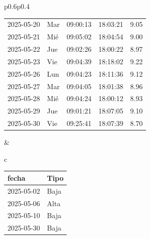 \documentclass[11pt,a4paper]{article}
\newcommand{\infobox}[2]{
  \begin{tcolorbox}[
    colback=grisclaro,
    colframe=corporativo,
    title=#1,
    fonttitle=\bfseries
  ]
#2
  \end{tcolorbox}
}
\begin{document}
\begin{tabular}{p{}p{}}
{\begin{tabular}{p{2cm} p{0.6cm} p{1.2cm} p{1.2cm} r}
2025-05-20 & Mar & 09:00:13 & 18:03:21 &9.05\\
\rowcolor{white}%
2025-05-21 & Mié & 09:05:02 & 18:04:54 &9.00\\
\rowcolor{white}%
2025-05-22 & Jue & 09:02:26 & 18:00:22 &8.97\\
\rowcolor{white}%
2025-05-23 & Vie & 09:04:39 & 18:18:02 &9.22\\
\rowcolor{white}%
2025-05-26 & Lun & 09:04:23 & 18:11:36 &9.12\\
\rowcolor{white}%
2025-05-27 & Mar & 09:04:05 & 18:01:38 &8.96\\
\rowcolor{white}%
2025-05-28 & Mié & 09:04:24 & 18:00:12 &8.93\\
\rowcolor{white}%
2025-05-29 & Jue & 09:01:21 & 18:07:05 &9.10\\
\rowcolor{white}%
2025-05-30 & Vie & 09:25:41 & 18:07:39 &8.70\\

\bottomrule
\end{tabular}
}
&
\begin{tabular}{c}

\infobox{D\'ias At\'ipicos}{
\begin{tabular}{p{2cm} p{2cm}}
\toprule
\rowcolor{grisclaro} \textbf{fecha} & \textbf{Tipo}\\
\midrule

2025-05-02 & Baja\\

2025-05-06 & Alta\\

2025-05-10 & Baja\\

2025-05-30 & Baja\\

\bottomrule
\end{tabular}
}
\\
\\




    

    
        
    

    


\end{tabular}
\end{tabular}
\end{document}
